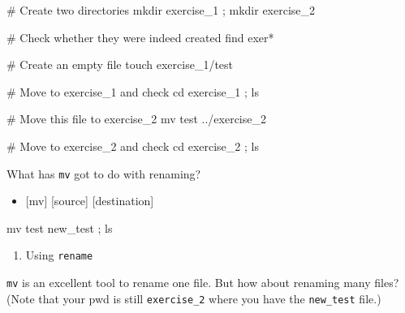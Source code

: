 \documentclass[
  letterpaper,
  DIV=11,
  numbers=noendperiod]{scrreprt}
\newenvironment{Shaded}{\begin{snugshade}}{\end{snugshade}}
\newcommand{\BuiltInTok}[1]{\textcolor[rgb]{0.00,0.23,0.31}{#1}}
\newcommand{\CommentTok}[1]{\textcolor[rgb]{0.37,0.37,0.37}{#1}}
\newcommand{\ControlFlowTok}[1]{\textcolor[rgb]{0.00,0.23,0.31}{#1}}
\newcommand{\DataTypeTok}[1]{\textcolor[rgb]{0.68,0.00,0.00}{#1}}
\newcommand{\DecValTok}[1]{\textcolor[rgb]{0.68,0.00,0.00}{#1}}
\newcommand{\FunctionTok}[1]{\textcolor[rgb]{0.28,0.35,0.67}{#1}}
\newcommand{\KeywordTok}[1]{\textcolor[rgb]{0.00,0.23,0.31}{#1}}
\newcommand{\NormalTok}[1]{\textcolor[rgb]{0.00,0.23,0.31}{#1}}
\newcommand{\PreprocessorTok}[1]{\textcolor[rgb]{0.68,0.00,0.00}{#1}}
\newcommand{\StringTok}[1]{\textcolor[rgb]{0.13,0.47,0.30}{#1}}
\newcommand{\VariableTok}[1]{\textcolor[rgb]{0.07,0.07,0.07}{#1}}
\providecommand{\tightlist}{%
  \setlength{\itemsep}{0pt}\setlength{\parskip}{0pt}}\usepackage{longtable,booktabs,array}
\begin{document}
\begin{Shaded}
\begin{Highlighting}[]

\CommentTok{\# Create two directories }
\FunctionTok{mkdir}\NormalTok{ exercise\_1 }\KeywordTok{;} \FunctionTok{mkdir}\NormalTok{ exercise\_2 }

\CommentTok{\# Check whether they were indeed created }
\FunctionTok{find}\NormalTok{ exer}\PreprocessorTok{*}

\CommentTok{\# Create an empty file }
\FunctionTok{touch}\NormalTok{ exercise\_1/test }

\CommentTok{\# Move to exercise\_1 and check }
\BuiltInTok{cd}\NormalTok{ exercise\_1 }\KeywordTok{;} \FunctionTok{ls} 

\CommentTok{\# Move this file to exercise\_2 }
\FunctionTok{mv}\NormalTok{ test ../exercise\_2 }

\CommentTok{\# Move to exercise\_2 and check }
\BuiltInTok{cd}\NormalTok{ exercise\_2 }\KeywordTok{;} \FunctionTok{ls} 
\end{Highlighting}
\end{Shaded}

What has \texttt{mv} got to do with renaming?

\begin{itemize}
\tightlist
\item
  {[}mv{]} {[}source{]} {[}destination{]}
\end{itemize}

\begin{Shaded}
\begin{Highlighting}[]

\FunctionTok{mv}\NormalTok{ test new\_test }\KeywordTok{;} \FunctionTok{ls} 
\end{Highlighting}
\end{Shaded}

\begin{enumerate}
\def\labelenumi{\arabic{enumi}.}
\setcounter{enumi}{1}
\tightlist
\item
  Using \texttt{rename}
\end{enumerate}

\texttt{mv} is an excellent tool to rename one file. But how about
renaming many files? (Note that your pwd is still \texttt{exercise\_2}
where you have the \texttt{new\_test} file.)

\begin{Shaded}
\end{Shaded}
\end{document}
